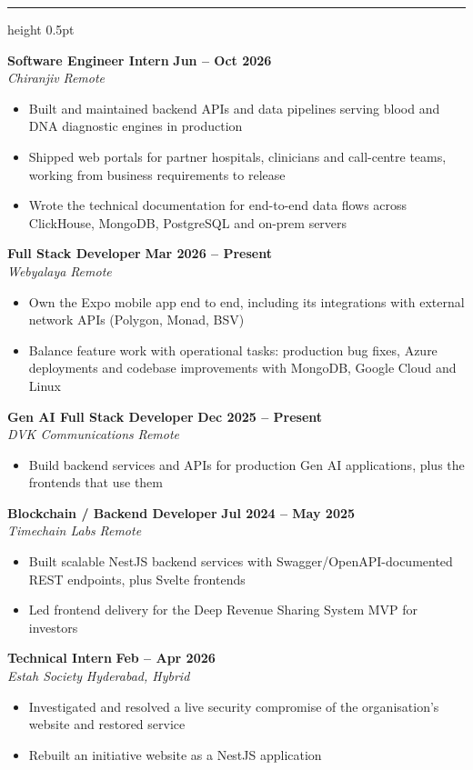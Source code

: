 \documentclass[11pt,a4paper]{article}
\newcommand{\cvsection}[1]{%
  \vspace{6pt}%
  \noindent{\large\textbf{\MakeUppercase{#1}}}%
  \vspace{2pt}%
  \hrule height 0.5pt%
  \vspace{4pt}%
}
\newcommand{\job}[4]{%
  \noindent \textbf{#1} \hfill \textbf{#2} \\
  \textit{#3} \hfill \textit{#4}%
}
\newenvironment{cvitems}{%
  \begin{itemize}[leftmargin=1.5em, itemsep=1pt, parsep=0pt, topsep=1.5pt]%
}{%
  \end{itemize}\vspace{2.5pt}%
}
\begin{document}
\newpage
\cvsection{Experience}

\job{Software Engineer Intern}{Jun -- Oct 2026}{Chiranjiv}{Remote}
\begin{cvitems}
  \item Built and maintained backend APIs and data pipelines serving blood and DNA diagnostic engines in production
  \item Shipped web portals for partner hospitals, clinicians and call-centre teams, working from business requirements to release
  \item Wrote the technical documentation for end-to-end data flows across ClickHouse, MongoDB, PostgreSQL and on-prem servers
\end{cvitems}

\job{Full Stack Developer}{Mar 2026 -- Present}{Webyalaya}{Remote}
\begin{cvitems}
  \item Own the Expo mobile app end to end, including its integrations with external network APIs (Polygon, Monad, BSV)
  \item Balance feature work with operational tasks: production bug fixes, Azure deployments and codebase improvements with MongoDB, Google Cloud and Linux
\end{cvitems}

\job{Gen AI Full Stack Developer}{Dec 2025 -- Present}{DVK Communications}{Remote}
\begin{cvitems}
  \item Build backend services and APIs for production Gen AI applications, plus the frontends that use them
\end{cvitems}

\job{Blockchain / Backend Developer}{Jul 2024 -- May 2025}{Timechain Labs}{Remote}
\begin{cvitems}
  \item Built scalable NestJS backend services with Swagger/OpenAPI-documented REST endpoints, plus Svelte frontends
  \item Led frontend delivery for the Deep Revenue Sharing System MVP for investors
\end{cvitems}

\job{Technical Intern}{Feb -- Apr 2026}{Estah Society}{Hyderabad, Hybrid}
\begin{cvitems}
  \item Investigated and resolved a live security compromise of the organisation's website and restored service
  \item Rebuilt an initiative website as a NestJS application
\end{cvitems}
\end{document}
